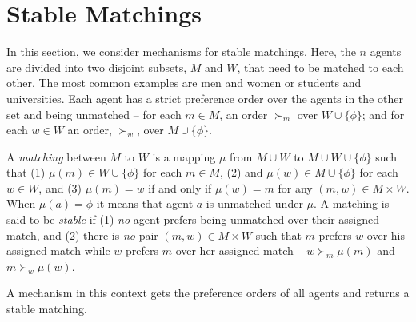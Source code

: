 
\newcommand{\men}{M}
\newcommand{\women}{W}
\newcommand{\man}{m}
\newcommand{\woman}{w}

\section{Stable Matchings}\label{sec:matching}


In this section, we consider mechanisms for stable matchings. 
Here, the $n$ agents are divided into two disjoint subsets, $\men$ and $\women$, that need to be matched to each other. The most common examples are men and women or students and universities. 
Each agent has a strict preference order over the agents in the other set and being unmatched -- for each $\man \in \men$, an order $\succ_{\man} $ over $\women\cup \{\phi\}$; and for each $\woman \in \women$ an order, $\succ_{\woman}$, over $\men\cup \{\phi\}$.  

A \emph{matching} between $\men$ to $\women$ is a mapping $\mu$ from $\men \cup \women$ to $\men \cup \women \cup \{\phi\}$ such that (1) $\mu(\man) \in \women \cup \{\phi\}$ for each $\man \in \men$, (2) and $\mu(\woman) \in \men \cup \{\phi\}$ for each $\woman \in \women$, and (3) $\mu(\man) = \woman$ if and only if $\mu(\woman) = \man$ for any $(\man, \woman) \in \men \times \women$. 
When $\mu(a) = \phi$ it means that agent $a$ is unmatched under $\mu$. 
%
A matching is said to be \emph{stable} if (1) \emph{no} agent prefers being unmatched over their assigned match, and (2) there is \emph{no} pair $(\man, \woman) \in \men \times \women$ such that $\man$ prefers $\woman$ over his assigned match while $\woman$ prefers $\man$ over her assigned match -- $\woman \succ_{\man} \mu(\man)$ and $\man \succ_{\woman} \mu(\woman)$.


A mechanism in this context gets the preference orders of all agents and returns a stable matching.

